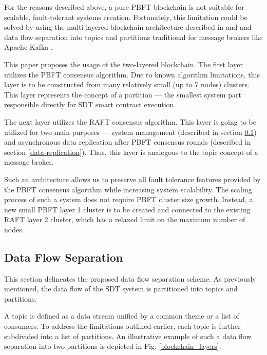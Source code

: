 \documentclass[10pt]{llncs}
\begin{document}
For the reasons described above, a pure PBFT blockchain is not suitable for scalable, fault-tolerant systems creation.
Fortunately, this limitation could be solved by using the multi-layered blockchain architecture described in \cite{Bogdanov2024} and \cite{Lin2023} and 
data flow separation into topics and partitions traditional for message brokers like Apache Kafka \cite{apachekafka}.

This paper proposes the usage of the two-layered blockchain.
The first layer utilizes the PBFT consensus algorithm.
Due to known algorithm limitations, this layer is to be constructed from many relatively small (up to 7 nodes) clusters.
This layer represents the concept of a partition --- the smallest system part responsible directly for SDT smart contract execution.

The next layer utilizes the RAFT \cite{ongaro2015raft} consensus algorithm.
This layer is going to be utilized for two main purposes --- system management (described in section \ref{data-flow}) and asynchronous data replication after PBFT consensus rounds (described in section \ref{data-replication}).
Thus, this layer is analogous to the topic concept of a message broker.

Such an architecture allows us to preserve all fault tolerance features provided by the PBFT consensus algorithm while increasing system scalability.
The scaling process of such a system does not require PBFT cluster size growth. 
Instead, a new small PBFT layer 1 cluster is to be created and connected to the existing RAFT layer 2 cluster, which has a relaxed limit on the maximum number of nodes.

\subsection{Data Flow Separation}\label{data-flow}

This section delineates the proposed data flow separation scheme. 
As previously mentioned, the data flow of the SDT system is partitioned into topics and partitions.

A topic is defined as a data stream unified by a common theme or a list of consumers. 
To address the limitations outlined earlier, each topic is further subdivided into a list of partitions.
 An illustrative example of such a data flow separation into two partitions is depicted in Fig. \ref{blockchain_layers}.
\end{document}

